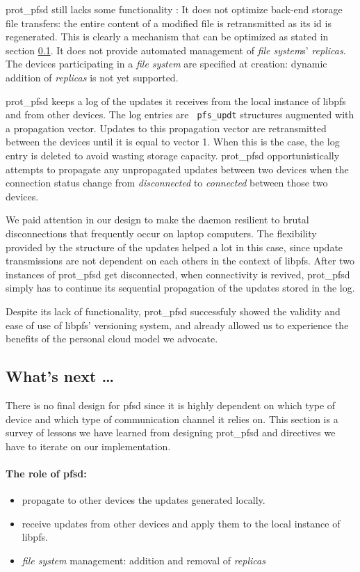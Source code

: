 prot\_pfsd still lacks some functionality : It does not optimize
back-end storage file transfers: the entire content of a modified file
is retransmitted as its id is regenerated. This is clearly a mechanism
that can be optimized as stated in section \ref{subsec:depfsd}. It
does not provide automated management of \emph{file system}s'
\emph{replicas}. The devices participating in a \emph{file
  system} are specified at creation: dynamic addition of
\emph{replicas} is not yet supported.

prot\_pfsd keeps a log of the updates it receives from the local
instance of libpfs and from other devices. The log entries are {\tt
  pfs\_updt} structures augmented with a propagation vector. Updates
to this propagation vector are retransmitted between the
devices until it is equal to vector 1. When this is the case,
the log entry is deleted to avoid wasting storage capacity. prot\_pfsd
opportunistically attempts to propagate any unpropagated updates
between two devices when the connection status change from
\emph{disconnected} to \emph{connected} between those two
devices.

We paid attention in our design to make the daemon resilient to brutal
disconnections that frequently occur on laptop computers. The
flexibility provided by the structure of the updates helped a lot in
this case, since update transmissions are not dependent on each others
in the context of libpfs. After two instances of prot\_pfsd get
disconnected, when connectivity is revived, prot\_pfsd simply has to
continue its sequential propagation of the updates stored in the log.

Despite its lack of functionality, prot\_pfsd successfuly showed the
validity and ease of use of libpfs' versioning system, and already
allowed us to experience the benefits of the personal cloud model we
advocate.

\subsection {What's next \ldots}
\label {subsec:depfsd}

There is no final design for pfsd since it is highly dependent on
which type of device and which type of communication channel it relies
on. This section is a survey of lessons we have learned from designing
prot\_pfsd and directives we have to iterate on our implementation.

\paragraph {The role of pfsd:}
\begin{itemize}
\item propagate to other devices the updates generated locally.
\item receive updates from other devices and apply them to the local
  instance of libpfs.
\item \emph{file system} management: addition and removal of
  \emph{replicas}
\end{itemize}

